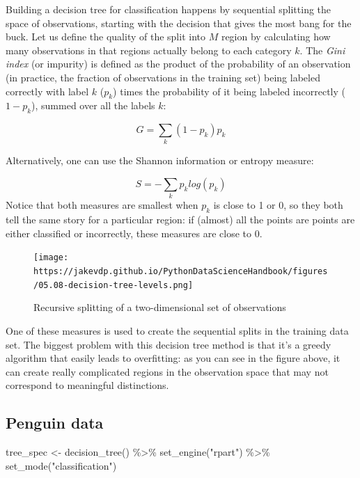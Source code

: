 \documentclass[
  letterpaper,
  DIV=11,
  numbers=noendperiod]{scrreprt}
\newenvironment{Shaded}{\begin{snugshade}}{\end{snugshade}}
\newcommand{\FunctionTok}[1]{\textcolor[rgb]{0.28,0.35,0.67}{#1}}
\newcommand{\NormalTok}[1]{\textcolor[rgb]{0.00,0.23,0.31}{#1}}
\newcommand{\OtherTok}[1]{\textcolor[rgb]{0.00,0.23,0.31}{#1}}
\newcommand{\SpecialCharTok}[1]{\textcolor[rgb]{0.37,0.37,0.37}{#1}}
\newcommand{\StringTok}[1]{\textcolor[rgb]{0.13,0.47,0.30}{#1}}
\begin{document}
Building a decision tree for classification happens by sequential
splitting the space of observations, starting with the decision that
gives the most bang for the buck. Let us define the quality of the split
into \(M\) region by calculating how many observations in that regions
actually belong to each category \(k\). The \emph{Gini index} (or
impurity) is defined as the product of the probability of an observation
(in practice, the fraction of observations in the training set) being
labeled correctly with label \(k\) (\(p_k\)) times the probability of it
being labeled incorrectly (\(1-p_k\)), summed over all the labels \(k\):

\[
G = \sum_k (1-p_k)p_k
\]

Alternatively, one can use the Shannon information or entropy measure:

\[
S = -\sum_k p_k log(p_k)
\] Notice that both measures are smallest when \(p_k\) is close to 1 or
0, so they both tell the same story for a particular region: if (almost)
all the points are points are either classified or incorrectly, these
measures are close to 0.

\begin{figure}

{\centering \texttt{[image: https://jakevdp.github.io/PythonDataScienceHandbook/figures/05.08-decision-tree-levels.png]}

}

\caption{Recursive splitting of a two-dimensional set of observations}

\end{figure}

One of these measures is used to create the sequential splits in the
training data set. The biggest problem with this decision tree method is
that it's a greedy algorithm that easily leads to overfitting: as you
can see in the figure above, it can create really complicated regions in
the observation space that may not correspond to meaningful
distinctions.

\hypertarget{penguin-data-1}{%
\subsection{Penguin data}\label{penguin-data-1}}

\begin{Shaded}
\begin{Highlighting}[]
\NormalTok{tree\_spec }\OtherTok{\textless{}{-}} \FunctionTok{decision\_tree}\NormalTok{() }\SpecialCharTok{\%\textgreater{}\%}
  \FunctionTok{set\_engine}\NormalTok{(}\StringTok{"rpart"}\NormalTok{) }\SpecialCharTok{\%\textgreater{}\%}
  \FunctionTok{set\_mode}\NormalTok{(}\StringTok{"classification"}\NormalTok{)}
\end{Highlighting}
\end{Shaded}
\end{document}
